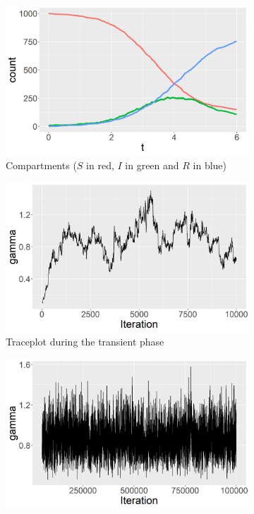 \documentclass[12pt]{article}
\begin{document}
\begin{figure}
	\begin{center}
		\begin{subfigure}[b]{0.32\textwidth}
			\centering
			\includegraphics[width=\textwidth]{E1_trajectories}
			\caption{Compartments ($S$ in red, $I$ in green and $R$ in blue)}
			\label{fig:E1_trajectories}
		\end{subfigure}
		\hfill
		\begin{subfigure}[b]{0.32\textwidth}
			\centering
			\includegraphics[width=\textwidth]{E1_short_no_burn_gamma_tp}
			\caption{Traceplot during the transient phase}
			\label{fig:E1_short_no_burn_gamma_tp}
		\end{subfigure}
		\hfill
		\begin{subfigure}[b]{0.32\textwidth}
			\centering
			\includegraphics[width=\textwidth]{E1_burn_gamma_tp}

\end{subfigure}
\end{center}
\end{figure}
\end{document}
